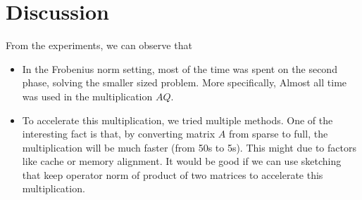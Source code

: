 \section{Discussion}

From the experiments,
we can observe that
\begin{itemize}
    \item In the Frobenius norm setting,
        most of the time was spent on the second phase,
        \ie solving the smaller sized problem.
        More specifically,
        Almost all time was used in the multiplication $AQ$.
    \item To accelerate this multiplication,
        we tried multiple methods.
        One of the interesting fact is that,
        by converting matrix $A$ from sparse to full,
        the multiplication will be much faster
        (from 50s to 5s).
        This might due to factors like cache or memory alignment.
        It would be good if we can use sketching
        that keep operator norm of product of two matrices
        to accelerate this multiplication.
\end{itemize}
